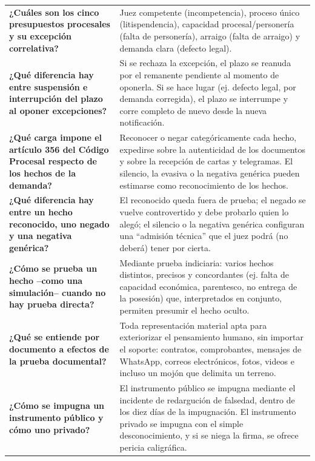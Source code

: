 \documentclass[12pt,oneside]{book}
\begin{document}
\begin{longtable}{
    >{\raggedright\arraybackslash}p{}
    >{\raggedright\arraybackslash}p{}
}
\textbf{¿Cuáles son los cinco presupuestos procesales y su excepción correlativa?} &
Juez competente (incompetencia), proceso único (litispendencia), capacidad procesal/personería (falta de personería), arraigo (falta de arraigo) y demanda clara (defecto legal). \\

\textbf{¿Qué diferencia hay entre suspensión e interrupción del plazo al oponer excepciones?} &
Si se rechaza la excepción, el plazo se reanuda por el remanente pendiente al momento de oponerla. Si se hace lugar (ej. defecto legal, por demanda corregida), el plazo se interrumpe y corre completo de nuevo desde la nueva notificación. \\

\textbf{¿Qué carga impone el artículo 356 del Código Procesal respecto de los hechos de la demanda?} &
Reconocer o negar categóricamente cada hecho, expedirse sobre la autenticidad de los documentos y sobre la recepción de cartas y telegramas. El silencio, la evasiva o la negativa genérica pueden estimarse como reconocimiento de los hechos. \\

\textbf{¿Qué diferencia hay entre un hecho reconocido, uno negado y una negativa genérica?} &
El reconocido queda fuera de prueba; el negado se vuelve controvertido y debe probarlo quien lo alegó; el silencio o la negativa genérica configuran una ``admisión técnica'' que el juez podrá (no deberá) tener por cierta. \\

\textbf{¿Cómo se prueba un hecho --como una simulación-- cuando no hay prueba directa?} &
Mediante prueba indiciaria: varios hechos distintos, precisos y concordantes (ej. falta de capacidad económica, parentesco, no entrega de la posesión) que, interpretados en conjunto, permiten presumir el hecho oculto. \\

\textbf{¿Qué se entiende por documento a efectos de la prueba documental?} &
Toda representación material apta para exteriorizar el pensamiento humano, sin importar el soporte: contratos, comprobantes, mensajes de WhatsApp, correos electrónicos, fotos, videos e incluso un mojón que delimita un terreno. \\

\textbf{¿Cómo se impugna un instrumento público y cómo uno privado?} &
El instrumento público se impugna mediante el incidente de redargución de falsedad, dentro de los diez días de la impugnación. El instrumento privado se impugna con el simple desconocimiento, y si se niega la firma, se ofrece pericia caligráfica. \\


\end{longtable}
\end{document}
